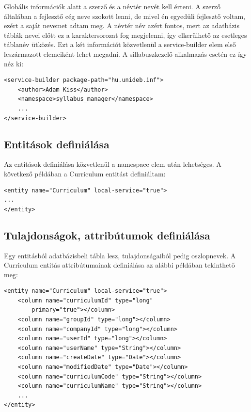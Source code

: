 \documentclass[hidelinks, 12pt, a4paper]{report}
\begin{document}
Globális információk alatt a szerző és a névtér nevét kell érteni. A szerző általában a fejlesztő cég neve szokott lenni, de mivel én egyedüli fejlesztő voltam, ezért a saját nevemet adtam meg. A névtér név azért fontos, mert az adatbázis táblák nevei előtt ez a karaktersorozat fog megjelenni, így elkerülhető az esetleges táblanév ütközés. Ezt a két információt közvetlenül a service-builder elem első leszármazott elemeiként lehet megadni. A sillabuszkezelő alkalmazás esetén ez így néz ki:

\begin{minipage}{\linewidth}
\begin{lstlisting}[basicstyle=\small]
<service-builder package-path="hu.unideb.inf">
	<author>Adam Kiss</author>
	<namespace>syllabus_manager</namespace>
	...
</service-builder>
\end{lstlisting}
\end{minipage}

\subsection{Entitások definiálása}

Az entitások definiálása közvetlenül a namespace elem után lehetséges. A következő példában a Curriculum entitást definiáltam:

\begin{minipage}{\linewidth}
\begin{lstlisting}[basicstyle=\small]
<entity name="Curriculum" local-service="true">
...
</entity>
\end{lstlisting}
\end{minipage}

\subsection{Tulajdonságok, attribútumok definiálása}

Egy entitásból adatbázisbeli tábla lesz, tulajdonságaiból pedig oszlopnevek. A Curriculum entitás attribútumainak definiálása az alábbi példában tekinthető meg:

\begin{minipage}{\linewidth}
\begin{lstlisting}[basicstyle=\small]
<entity name="Curriculum" local-service="true">
	<column name="curriculumId" type="long"
		primary="true"></column>
	<column name="groupId" type="long"></column>
	<column name="companyId" type="long"></column>
	<column name="userId" type="long"></column>
	<column name="userName" type="String"></column>
	<column name="createDate" type="Date"></column>
	<column name="modifiedDate" type="Date"></column>
	<column name="curriculumCode" type="String"></column>
	<column name="curriculumName" type="String"></column>
	...
</entity>
\end{lstlisting}
\end{minipage}
\end{document}
